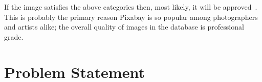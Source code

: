 \documentclass[10pt, a4paper, twocolumn]{article} %
\begin{document}
If the image satisfies the above categories then, most likely, it will be approved~\cite{Pixabay:Tagging}.  This is probably the primary reason Pixabay is so popular among photographers and artists alike; the overall quality of images in the database is professional grade.

\section{Problem Statement} %

\end{document}

